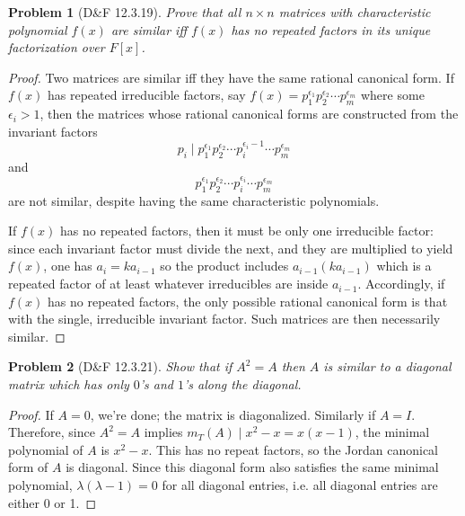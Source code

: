 \documentclass{article}
\newtheorem{plm}{Problem}
\begin{document}
\begin{plm}[D\&F 12.3.19]
  Prove that all $n \times n$ matrices with characteristic polynomial $f(x)$ are similar iff $f(x)$ has no repeated factors
  in its unique factorization over $F[x]$.
\end{plm}

\begin{proof}
  Two matrices are similar iff they have the same rational canonical form.
  If $f(x)$ has repeated irreducible factors, say $f(x) = p_{1}^{\epsilon_{1}}p_{2}^{\epsilon_{2}} \cdots p_{m}^{\epsilon_m}$ where some $\epsilon_i > 1$,
  then the matrices whose rational canonical forms are constructed from the invariant factors
  \[
    p_{i} \mid p_{1}^{\epsilon_{1}}p_{2}^{\epsilon_{2}} \cdots p_{i}^{\epsilon_{i} - 1} \cdots p_{m}^{\epsilon_m}
  \]
  and
  \[
    p_{1}^{\epsilon_{1}}p_{2}^{\epsilon_{2}} \cdots p_{i}^{\epsilon_{i}} \cdots p_{m}^{\epsilon_m}
  \]
  are not similar, despite having the same characteristic polynomials.

  If $f(x)$ has no repeated factors, then it must be only one irreducible factor: since each invariant factor must divide the next,
  and they are multiplied to yield $f(x)$, one has $a_{i} = ka_{i-1}$ so the product includes $a_{i-1}(ka_{i-1})$ which is a repeated factor
  of at least whatever irreducibles are inside $a_{i-1}$.
  Accordingly, if $f(x)$ has no repeated factors, the only possible rational canonical form is that with the single, irreducible invariant factor.
  Such matrices are then necessarily similar.
\end{proof}

\begin{plm}[D\&F 12.3.21]
  Show that if $A^{2} = A$ then $A$ is similar to a diagonal matrix which has only $0$'s and $1$'s along the diagonal.
\end{plm}

\begin{proof}
  If $A = 0$, we're done; the matrix is diagonalized.
  Similarly if $A = I$.
  Therefore, since $A^{2} = A$ implies $m_{T}(A) \mid x^{2} - x = x(x - 1)$, the minimal polynomial of $A$ is $x^{2} - x$.
  This has no repeat factors, so the Jordan canonical form of $A$ is diagonal.
  Since this diagonal form also satisfies the same minimal polynomial, $\lambda(\lambda - 1) = 0$ for all diagonal entries,
  i.e. all diagonal entries are either 0 or 1.
\end{proof}
\end{document}
